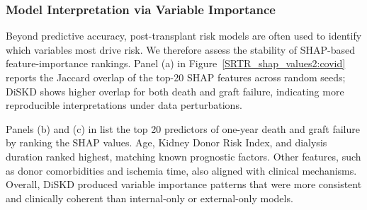 \documentclass{article}
\theoremstyle{plain}
\theoremstyle{definition}
\theoremstyle{remark}
\begin{document}
\subsubsection{Model Interpretation via Variable Importance}
\label{A.SRTR1.SHAP}
Beyond predictive accuracy, post-transplant risk models are often used to identify which variables most drive risk.
We therefore assess the stability of SHAP-based feature-importance rankings.
Panel (a) in Figure~\ref{SRTR_shap_values2:covid} reports the Jaccard overlap of the top-20 SHAP features across random seeds; DiSKD shows higher overlap for both death and graft failure, indicating more reproducible interpretations under data perturbations.






Panels (b) and (c) in list the top 20 predictors of one-year death and graft failure by ranking the SHAP values. Age, Kidney Donor Risk Index, and dialysis duration ranked highest, matching known prognostic factors. Other features, such as donor comorbidities and ischemia time, also aligned with clinical mechanisms. Overall, DiSKD produced variable importance patterns that were more consistent and clinically coherent than internal-only or external-only models.
\end{document}
